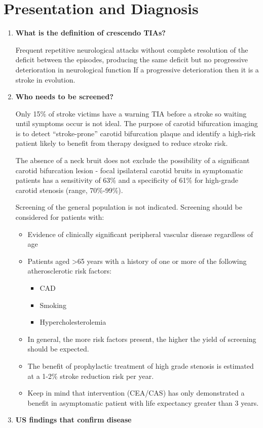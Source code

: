 \documentclass[
]{book}
\begin{document}
\hypertarget{presentation-and-diagnosis}{%
\section{Presentation and Diagnosis}\label{presentation-and-diagnosis}}

\begin{enumerate}
\def\labelenumi{\arabic{enumi}.}
\item
  \textbf{What is the definition of crescendo TIAs?}

  Frequent repetitive neurological attacks without complete resolution
  of the deficit between the episodes, producing the same deficit but
  no progressive deterioration in neurological function If a
  progressive deterioration then it is a stroke in evolution.
\item
  \textbf{Who needs to be screened?}

  Only 15\% of stroke victims have a warning TIA before a stroke so
  waiting until symptoms occur is not ideal. The purpose of carotid
  bifurcation imaging is to detect ``stroke-prone'' carotid bifurcation
  plaque and identify a high-risk patient likely to benefit from
  therapy designed to reduce stroke risk.

  The absence of a neck bruit does not exclude the possibility of a
  significant carotid bifurcation lesion - focal ipsilateral carotid
  bruits in symptomatic patients has a sensitivity of 63\% and a
  specificity of 61\% for high-grade carotid stenosis (range, 70\%-99\%).

  Screening of the general population is not indicated. Screening
  should be considered for patients with:

  \begin{itemize}
  \item
    Evidence of clinically significant peripheral vascular disease
    regardless of age
  \item
    Patients aged \textgreater65 years with a history of one or more of the
    following atherosclerotic risk factors:

    \begin{itemize}
    \item
      CAD
    \item
      Smoking
    \item
      Hypercholesterolemia
    \end{itemize}
  \item
    In general, the more risk factors present, the higher the yield
    of screening should be expected.
  \item
    The benefit of prophylactic treatment of high grade stenosis is
    estimated at a 1-2\% stroke reduction risk per year.
    \citet{naylorWhyManagementAsymptomatic2015}
  \item
    Keep in mind that intervention (CEA/CAS) has only demonstrated a
    benefit in asymptomatic patient with life expectancy greater
    than 3 years. \citep{bulbuliaAsymptomaticCarotidSurgery2017, halliday10yearStrokePrevention2010, rosenfieldRandomizedTrialStent2016}
  \end{itemize}
\item
  \textbf{US findings that confirm disease}


\end{enumerate}
\end{document}
